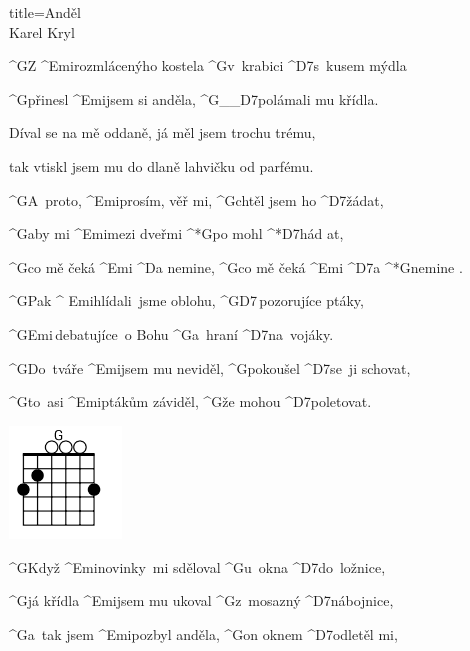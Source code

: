 \begin{song}{title=\predtitle \centering Anděl \\\large Karel Kryl   \vspace*{-0.3cm}}  %
\begin{centerjustified}
\nejnejvetsi
\sloka
	^{G}Z ^{\z Emi}rozmlácenýho kostela ^{G\z}v~krabici ^{D7\z}s~kusem mýdla

	^{G\z}přinesl ^{Emi}jsem si anděla, ^{G{\color{white}\_\_}D7}polámali mu křídla.

	Díval se na mě oddaně, já měl jsem trochu trému,

	tak vtiskl jsem mu do dlaně lahvičku od parfému.

	^{G\z}A~proto, ^{Emi\z }prosím, věř mi, ^{G\z}chtěl jsem ho ^{D7\z}žádat,

	^{G}aby mi ^{Emi\z }mezi dveřmi ^*{G}po mohl ^*{D7}hád at,

	^{G}co mě čeká ^{Emi} ^{D}a nemine, ^{G}co mě čeká ^{Emi} ^{D7}a  ^*{\z G}nemine .

\begin{minipage}{0.65\textwidth}
\sloka
	^{G\z}Pak ^{ Emi}hlídali~jsme oblohu, ^{G\z D7\,}pozorujíce ptáky,

	^{G\z Emi\:\,}debatujíce~o Bohu ^{G\z}a~hraní ^{D7\z}na~vojáky.

	^{G\z}Do~tváře ^{Emi\z}jsem mu neviděl, ^{G\z}pokoušel ^{D7\z}se~ji schovat,

	^{G\z}to~asi ^{Emi\z}ptákům záviděl, ^{G}že mohou ^{D7\z}poletovat.

\end{minipage}
\begin{minipage}{0.1\textwidth}
\includegraphics[width=3cm]{../Akordy/g.png}
\end{minipage}

\begin{minipage}{0.65\textwidth}
\sloka
	^{G\z}Když ^{Emi\:\:}novinky~mi sděloval ^{G\z}u~okna ^{D7\z}do~ložnice,

	^{G}já křídla ^{Emi\z}jsem mu ukoval ^{G\z}z~mosazný ^{D7\z}nábojnice,

	^{G\z}a~tak jsem ^{Emi\z}pozbyl anděla, ^{G}on oknem ^{D7\z}odletěl mi,


\end{minipage}
\end{centerjustified}
\end{song}
